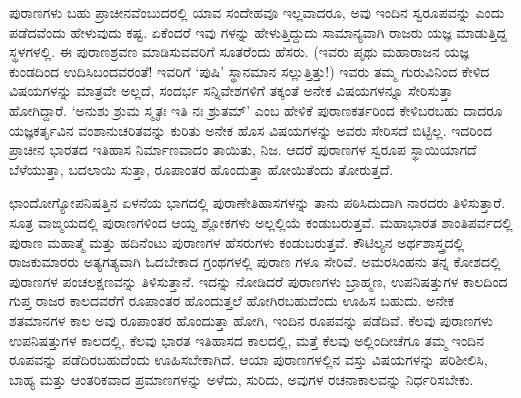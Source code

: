ಪುರಾಣಗಳು ಬಹು ಪ್ರಾಚೀನವೆಂಬುದರಲ್ಲಿ ಯಾವ ಸಂದೇಹವೂ ಇಲ್ಲವಾದರೂ, ಅವು ಇಂದಿನ ಸ್ವರೂಪವನ್ನು ಎಂದು ಪಡೆದವೆಂದು ಹೇಳುವುದು ಕಷ್ಟ. ಏಕೆಂದರೆ ಇವು ಗಳನ್ನು ಹೇಳುತ್ತಿದ್ದುದು ಸಾಮಾನ್ಯವಾಗಿ ರಾಜರು ಯಜ್ಞ ಮಾಡುತ್ತಿದ್ದ ಸ್ಥಳಗಳಲ್ಲಿ. ಈ ಪುರಾಣಶ್ರವಣ ಮಾಡಿಸುವವರಿಗೆ ಸೂತರೆಂದು ಹೆಸರು. (ಇವರು ಪೃಥು ಮಹಾರಾಜನ ಯಜ್ಞ ಕುಂಡದಿಂದ ಉದಿಸಿಬಂದವರಂತೆ! ಇವರಿಗೆ ‘ಪುಷಿ’ ಸ್ಥಾನಮಾನ ಸಲ್ಲುತ್ತಿತ್ತು!) ಇವರು ತಮ್ಮ ಗುರುವಿನಿಂದ ಕೇಳಿದ ವಿಷಯಗಳನ್ನು ಮಾತ್ರವೇ ಅಲ್ಲದೆ, ಸಂದರ್ಭ ಸನ್ನಿವೇಶಗಳಿಗೆ ತಕ್ಕಂತೆ ಅನೇಕ ವಿಷಯಗಳನ್ನೂ ಸೇರಿಸುತ್ತಾ ಹೋಗಿದ್ದಾರೆ. ‘ಅನುಶು ಶ್ರುಮ ಸ್ಮೃತಃ ಇತಿ ನಃ ಶ್ರುತಮ್​’ ಎಂಬ ಹೇಳಿಕೆ ಪುರಾಣಕರ್ತರಿಂದ ಕೇಳಿಬರಬಹು ದಾದರೂ ಯಜ್ಞಕರ್ತೃವಿನ ವಂಶಾನುಚರಿತವನ್ನು ಕುರಿತು ಅನೇಕ ಹೊಸ ವಿಷಯಗಳನ್ನು ಅವರು ಸೇರಿಸದೆ ಬಿಟ್ಟಿಲ್ಲ. ಇದರಿಂದ ಪ್ರಾಚೀನ ಭಾರತದ ಇತಿಹಾಸ ನಿರ್ಮಾಣವಾದಂ ತಾಯಿತು, ನಿಜ. ಆದರೆ ಪುರಾಣಗಳ ಸ್ವರೂಪ ಸ್ಥಾಯಿಯಾಗದೆ ಬೆಳೆಯುತ್ತಾ, ಬದಲಾಯಿ ಸುತ್ತಾ, ರೂಪಾಂತರ ಹೊಂದುತ್ತಾ ಹೋಯಿತೆಂದು ತೋರುತ್ತದೆ.

ಛಾಂದೋಗ್ಯೋಪನಿಷತ್ತಿನ ಏಳನೆಯ ಭಾಗದಲ್ಲಿ ಪುರಾಣೇತಿಹಾಸಗಳನ್ನು ತಾನು ಪಠಿಸಿದುದಾಗಿ ನಾರದರು ತಿಳಿಸುತ್ತಾರೆ. ಸೂತ್ರ ವಾಙ್ಮಯದಲ್ಲಿ ಪುರಾಣಗಳಿಂದ ಆಯ್ದ ಶ್ಲೋಕಗಳು ಅಲ್ಲಲ್ಲಿಯೆ ಕಂಡುಬರುತ್ತವೆ. ಮಹಾಭಾರತ ಶಾಂತಿಪರ್ವದಲ್ಲಿ ಪುರಾಣ ಮಹಾತ್ಮೆ ಮತ್ತು ಹದಿನೆಂಟು ಪುರಾಣಗಳ ಹೆಸರುಗಳು ಕಂಡುಬರುತ್ತವೆ. ಕೌಟಿಲ್ಯನ ಅರ್ಥಶಾಸ್ತ್ರದಲ್ಲಿ ರಾಜಕುಮಾರರು ಅತ್ಯಗತ್ಯವಾಗಿ ಓದಬೇಕಾದ ಗ್ರಂಥಗಳಲ್ಲಿ ಪುರಾಣ ಗಳೂ ಸೇರಿವೆ. ಅಮರಸಿಂಹನು ತನ್ನ ಕೋಶದಲ್ಲಿ ಪುರಾಣಗಳ ಪಂಚಲಕ್ಷಣವನ್ನು ತಿಳಿಸುತ್ತಾನೆ. ಇದನ್ನು ನೋಡಿದರೆ ಪುರಾಣಗಳು ಬ್ರಾಹ್ಮಣ, ಉಪನಿಷತ್ತುಗಳ ಕಾಲದಿಂದ ಗುಪ್ತ ರಾಜರ ಕಾಲದವರೆಗೆ ರೂಪಾಂತರ ಹೊಂದುತ್ತಲೆ ಹೋಗಿರಬಹುದೆಂದು ಊಹಿಸ ಬಹುದು. ಅನೇಕ ಶತಮಾನಗಳ ಕಾಲ ಅವು ರೂಪಾಂತರ ಹೊಂದುತ್ತಾ ಹೋಗಿ, ಇಂದಿನ ರೂಪವನ್ನು ಪಡೆದಿವೆ. ಕೆಲವು ಪುರಾಣಗಳು ಉಪನಿಷತ್ತುಗಳ ಕಾಲದಲ್ಲಿ, ಕೆಲವು ಭಾರತ ಇತಿಹಾಸದ ಕಾಲದಲ್ಲಿ, ಮತ್ತೆ ಕೆಲವು ಅಲ್ಲಿಂದೀಚೆಗೂ ತಮ್ಮ ಇಂದಿನ ರೂಪವನ್ನು ಪಡೆದಿರಬಹುದೆಂದು ಊಹಿಸಬೇಕಾಗಿದೆ. ಆಯಾ ಪುರಾಣಗಳಲ್ಲಿನ ವಸ್ತು ವಿಷಯಗಳನ್ನು ಪರಿಶೀಲಿಸಿ, ಬಾಹ್ಯ ಮತ್ತು ಆಂತರಿಕವಾದ ಪ್ರಮಾಣಗಳನ್ನು ಅಳೆದು, ಸುರಿದು, ಅವುಗಳ ರಚನಾಕಾಲವನ್ನು ನಿರ್ಧರಿಸಬೇಕು.


